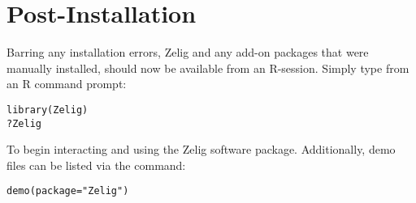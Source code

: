 \section{Post-Installation}

Barring any installation errors, Zelig and any add-on packages that were manually installed, should now be available from an R-session. Simply type from an R command prompt:

\begin{verbatim}
library(Zelig)
?Zelig
\end{verbatim}

To begin interacting and using the Zelig software package. Additionally, demo files can be listed via the command:

\begin{verbatim}
demo(package="Zelig")
\end{verbatim}
